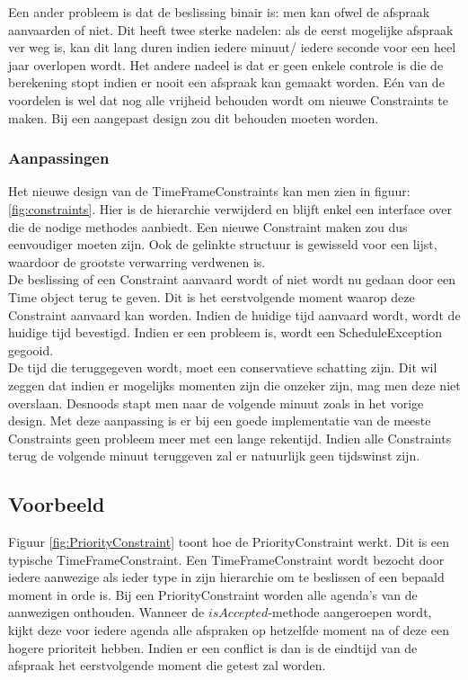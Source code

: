 Een ander probleem is dat de beslissing binair is: men kan ofwel de afspraak aanvaarden of niet.
Dit heeft twee sterke nadelen: als de eerst mogelijke afspraak ver weg is, kan dit lang duren indien iedere minuut/ iedere seconde voor een heel jaar overlopen wordt. 
Het andere nadeel is dat er geen enkele controle is die de berekening stopt indien er nooit een afspraak kan gemaakt worden. 
Eén van de voordelen is wel dat nog alle vrijheid behouden wordt om nieuwe Constraints te maken. 
Bij een aangepast design zou dit behouden moeten worden.

\subsubsection{Aanpassingen}
Het nieuwe design van de TimeFrameConstraints kan men zien in figuur: \ref{fig:constraints}. 
Hier is de hierarchie verwijderd en blijft enkel een interface over die de nodige methodes aanbiedt. 
Een nieuwe Constraint maken zou dus eenvoudiger moeten zijn. 
Ook de gelinkte structuur is gewisseld voor een lijst, waardoor de grootste verwarring verdwenen is. \\

De beslissing of een Constraint aanvaard wordt of niet wordt nu gedaan door een Time object terug te geven. 
Dit is het eerstvolgende moment waarop deze Constraint aanvaard kan worden. 
Indien de huidige tijd aanvaard wordt, wordt de huidige tijd bevestigd. 
Indien er een probleem is, wordt een ScheduleException gegooid. \\

De tijd die teruggegeven wordt, moet een conservatieve schatting zijn. 
Dit wil zeggen dat indien er mogelijks momenten zijn die onzeker zijn, mag men deze niet overslaan. 
Desnoods stapt men naar de volgende minuut zoals in het vorige design. 
Met deze aanpassing is er bij een goede implementatie van de meeste Constraints geen probleem meer met een lange rekentijd. 
Indien alle Constraints terug de volgende minuut teruggeven zal er natuurlijk geen tijdswinst zijn. 

\subsection{Voorbeeld}
Figuur \ref{fig:PriorityConstraint} toont hoe de PriorityConstraint werkt. Dit is een typische TimeFrameConstraint. 
Een TimeFrameConstraint wordt bezocht door iedere aanwezige als ieder type in zijn hierarchie om te beslissen of een bepaald moment in orde is. 
Bij een PriorityConstraint worden alle agenda's van de aanwezigen onthouden. 
Wanneer de $isAccepted$-methode aangeroepen wordt, kijkt deze voor iedere agenda alle afspraken op hetzelfde moment na of deze een hogere prioriteit hebben. 
Indien er een conflict is dan is de eindtijd van de afspraak het eerstvolgende moment die getest zal worden. \\

